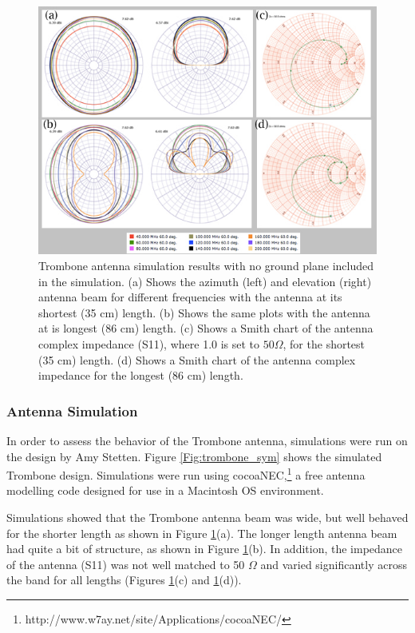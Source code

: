 \begin{figure}[htb]
\begin{center}
\includegraphics[width=0.95\linewidth]{SCIHI_system/figures/trombone_no_gp.jpg}
\caption{Trombone antenna simulation results with no ground plane included in the simulation. (a) Shows the azimuth (left) and elevation (right) antenna beam for different frequencies with the antenna at its shortest (35 cm) length. (b) Shows the same plots with the antenna at is longest (86 cm) length. (c) Shows a Smith chart of the antenna complex impedance (S11), where 1.0 is set to $50 \Omega$, for the shortest (35 cm) length. (d) Shows a Smith chart of the antenna complex impedance for the longest (86 cm) length. }
\label{Fig:trsym_nogp}
\end{center}
\end{figure}

\subsubsection{Antenna Simulation}
In order to assess the behavior of the Trombone antenna, simulations were run on the design by Amy Stetten. Figure \ref{Fig:trombone_sym} shows the simulated Trombone design. Simulations were run using cocoaNEC,\footnote{http://www.w7ay.net/site/Applications/cocoaNEC/} a free antenna modelling code designed for use in a Macintosh OS environment. 

Simulations showed that the Trombone antenna beam was wide, but well behaved for the shorter length as shown in Figure \ref{Fig:trsym_nogp}(a). The longer length antenna beam had quite a bit of structure, as shown in Figure \ref{Fig:trsym_nogp}(b). In addition, the impedance of the antenna (S11) was not well matched to 50 $\Omega$ and varied significantly across the band for all lengths (Figures \ref{Fig:trsym_nogp}(c) and \ref{Fig:trsym_nogp}(d)). 

